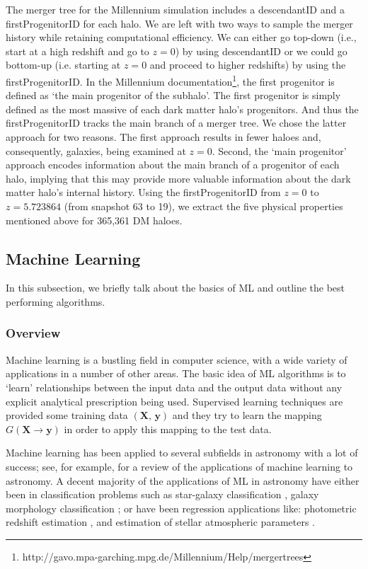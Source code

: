 \documentclass[a4paper,fleqn,usenatbib]{mnras}
\begin{document}
\par	The merger tree for the Millennium simulation includes a descendantID and a firstProgenitorID for each halo. We are left with two ways to sample the merger history while retaining computational efficiency. We can either go top-down (i.e., start at a high redshift and go to $z=0$) by using descendantID or we could go bottom-up (i.e. starting at $z=0$ and proceed to higher redshifts) by using the firstProgenitorID. In the Millennium documentation\footnote{http://gavo.mpa-garching.mpg.de/Millennium/Help/mergertrees}, the first progenitor is defined as `the main progenitor of the subhalo'. The first progenitor is simply defined as the most massive of each dark matter halo's progenitors. And thus the firstProgenitorID tracks the main branch of a merger tree. We chose the latter approach for two reasons. The first approach results in fewer haloes and, consequently, galaxies, being examined at $z=0$. Second, the `main progenitor' approach encodes information about the main branch of a progenitor of each halo, implying that this may provide more valuable information about the dark matter halo's internal history. Using the firstProgenitorID from $z=0$ to $z=5.723864$ (from snapshot 63 to 19), we extract the five physical properties mentioned above for 365,361 DM haloes. 

\subsection{Machine Learning} \label{ml}
In this subsection, we briefly talk about the basics of ML and outline the best performing algorithms.
\subsubsection{Overview} \label{ml_overview}
Machine learning is a bustling field in computer science, with a wide variety of applications in a number of other areas. The basic idea of ML algorithms is to `learn' relationships between the input data and the output data without any explicit analytical prescription being used. Supervised learning techniques are provided some training data $(\textbf{X, y})$ and they try to learn the mapping $G(\textbf{X} \rightarrow \textbf{y})$ in order to apply this mapping to the test data. 
\par Machine learning has been applied to several subfields in astronomy with a lot of success; see, for example, \citet{ball2010data, ivezic2014statistics} for a review of the applications of machine learning to astronomy. A decent majority of the applications of ML in astronomy have either been in classification problems such as star-galaxy classification \citep{ball2006robust, kim2015hybrid}, galaxy morphology classification \citep{banerji2010galaxy, dieleman2015rotation};  or have been regression applications like: photometric redshift estimation  \citep{ball2007robust, gerdes2010arborz, kind2013tpz}, and estimation of stellar atmospheric parameters \citep{fiorentin2007estimation}. 
\end{document}
